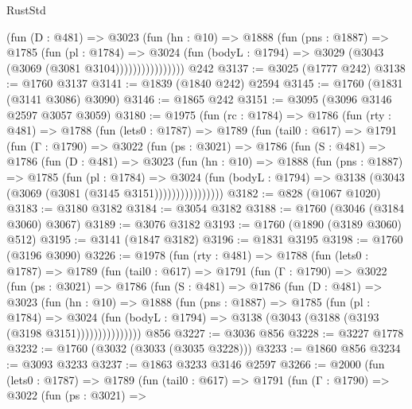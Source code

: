 \begin{lexlean}{RustStd}
\begin{coremodule}
                    (fun (D : @481) =>
                    @3023
                      (fun (hn : @10) =>
                      @1888
                        (fun (pns : @1887) =>
                        @1785
                          (fun (pl : @1784) =>
                          @3024
                            (fun (bodyL : @1794) => @3029 (@3043 (@3069 (@3081 @3104))))))))))))))))
    @242
@3137 := @3025 (@1777 @242)
@3138 := @1760 @3137
@3141 := @1839 (@1840 @242) @2594
@3145 := @1760 (@1831 (@3141 @3086) @3090)
@3146 := @1865 @242
@3151 := @3095 (@3096 @3146 @2597 @3057 @3059)
@3180 := @1975
    (fun (rc : @1784) =>
    @1786
      (fun (rty : @481) =>
      @1788
        (fun (lets0 : @1787) =>
        @1789
          (fun (tail0 : @617) =>
          @1791
            (fun (Γ : @1790) =>
            @3022
              (fun (ps : @3021) =>
              @1786
                (fun (S : @481) =>
                @1786
                  (fun (D : @481) =>
                  @3023
                    (fun (hn : @10) =>
                    @1888
                      (fun (pns : @1887) =>
                      @1785
                        (fun (pl : @1784) =>
                        @3024
                          (fun (bodyL : @1794) =>
                          @3138 (@3043 (@3069 (@3081 (@3145 @3151))))))))))))))))
@3182 := @828 (@1067 @1020)
@3183 := @3180 @3182
@3184 := @3054 @3182
@3188 := @1760 (@3046 (@3184 @3060) @3067)
@3189 := @3076 @3182
@3193 := @1760 (@1890 (@3189 @3060) @512)
@3195 := @3141 (@1847 @3182)
@3196 := @1831 @3195
@3198 := @1760 (@3196 @3090)
@3226 := @1978
    (fun (rty : @481) =>
    @1788
      (fun (lets0 : @1787) =>
      @1789
        (fun (tail0 : @617) =>
        @1791
          (fun (Γ : @1790) =>
          @3022
            (fun (ps : @3021) =>
            @1786
              (fun (S : @481) =>
              @1786
                (fun (D : @481) =>
                @3023
                  (fun (hn : @10) =>
                  @1888
                    (fun (pns : @1887) =>
                    @1785
                      (fun (pl : @1784) =>
                      @3024
                        (fun (bodyL : @1794) =>
                        @3138 (@3043 (@3188 (@3193 (@3198 @3151)))))))))))))))
    @856
@3227 := @3036 @856
@3228 := @3227 @1778
@3232 := @1760 (@3032 (@3033 (@3035 @3228)))
@3233 := @1860 @856
@3234 := @3093 @3233
@3237 := @1863 @3233 @3146 @2597
@3266 := @2000
    (fun (lets0 : @1787) =>
    @1789
      (fun (tail0 : @617) =>
      @1791
        (fun (Γ : @1790) =>
        @3022
          (fun (ps : @3021) =>

\end{coremodule}
\end{lexlean}
